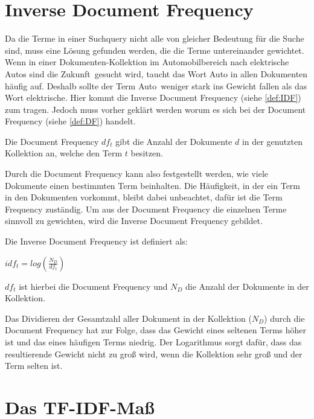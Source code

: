 \section{Inverse Document Frequency}
Da die Terme in einer Suchquery nicht alle von gleicher Bedeutung für die Suche sind, muss eine Lösung gefunden werden, die die Terme untereinander gewichtet. Wenn in einer Dokumenten-Kollektion im Automobilbereich nach \glqq elektrische Autos sind die Zukunft\grqq\ gesucht wird, taucht das Wort Auto in allen Dokumenten häufig auf. Deshalb sollte der Term \glqq Auto\grqq\ weniger stark ins Gewicht fallen als das Wort \glqq elektrische\grqq. Hier kommt die Inverse Document Frequency (siehe \cref{def:IDF}) zum tragen. Jedoch muss vorher geklärt werden worum es sich bei der Document Frequency (siehe \cref{def:DF}) handelt.

\begin{defi}\label{def:DF}
	Die Document Frequency $df_t$ gibt die Anzahl der Dokumente $d$ in der genutzten Kollektion an, welche den Term $t$ besitzen.
\end{defi}
\newpage
Durch die Document Frequency kann also festgestellt werden, wie viele Dokumente einen bestimmten Term beinhalten. Die Häufigkeit, in der ein Term in den Dokumenten vorkommt, bleibt dabei unbeachtet, dafür ist die Term Frequency zuständig. Um aus der Document Frequency die einzelnen Terme sinnvoll zu gewichten, wird die Inverse Document Frequency gebildet. 

\begin{defi}\label{def:IDF}
	Die Inverse Document Frequency ist definiert als:
	\begin{center}
		$idf_t = log(\frac{N_D}{df_t})$
	\end{center}
	$df_t$ ist hierbei die Document Frequency und $N_D$ die Anzahl der Dokumente in der Kollektion.
\end{defi}

Das Dividieren der Gesamtzahl aller Dokument in der Kollektion ($N_D$) durch die Document Frequency hat zur Folge, dass das Gewicht eines seltenen Terms höher ist und das eines häufigen Terms niedrig. Der Logarithmus sorgt dafür, dass das resultierende Gewicht nicht zu groß wird, wenn die Kollektion sehr groß und der Term selten ist.

\section{Das TF-IDF-Maß}

